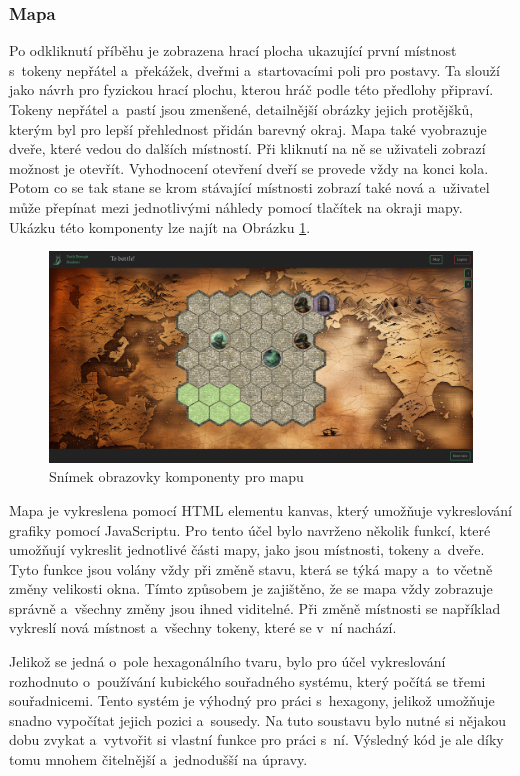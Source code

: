 \subsubsection*{Mapa}
Po odkliknutí příběhu je zobrazena hrací plocha ukazující první místnost s~tokeny nepřátel a~překážek, dveřmi a~startovacími poli pro postavy. Ta slouží jako návrh pro fyzickou hrací plochu, kterou hráč podle této předlohy připraví. Tokeny nepřátel a~pastí jsou zmenšené, detailnější obrázky jejich protějšků, kterým byl pro lepší přehlednost přidán barevný okraj. Mapa také vyobrazuje dveře, které vedou do dalších místností. Při kliknutí na ně se uživateli zobrazí možnost je otevřít. Vyhodnocení otevření dveří se provede vždy na konci kola. Potom co se tak stane se krom stávající místnosti zobrazí také nová a~uživatel může přepínat mezi jednotlivými náhledy pomocí tlačítek na okraji mapy. Ukázku této komponenty lze najít na Obrázku \ref{fig:map}.

\begin{figure}[h]
  \centering
  \includegraphics[width=\textwidth]{resources/figures/TTS-Map.png}
  \caption{Snímek obrazovky komponenty pro mapu}
  \label{fig:map}
\end{figure}

Mapa je vykreslena pomocí HTML elementu kanvas, který umožňuje vykreslování grafiky pomocí JavaScriptu. Pro tento účel bylo navrženo několik funkcí, které umožňují vykreslit jednotlivé části mapy, jako jsou místnosti, tokeny a~dveře. Tyto funkce jsou volány vždy při změně stavu, která se týká mapy a~to včetně změny velikosti okna. Tímto způsobem je zajištěno, že se mapa vždy zobrazuje správně a~všechny změny jsou ihned viditelné. Při změně místnosti se například vykreslí nová místnost a~všechny tokeny, které se v~ní nachází. 

Jelikož se jedná o~pole hexagonálního tvaru, bylo pro účel vykreslování rozhodnuto o~používání kubického souřadného systému, který počítá se třemi souřadnicemi. Tento systém je výhodný pro práci s~hexagony, jelikož umožňuje snadno vypočítat jejich pozici a~sousedy. Na tuto soustavu bylo nutné si nějakou dobu zvykat a~vytvořit si vlastní funkce pro práci s~ní. Výsledný kód je ale díky tomu mnohem čitelnější a~jednodušší na úpravy.

